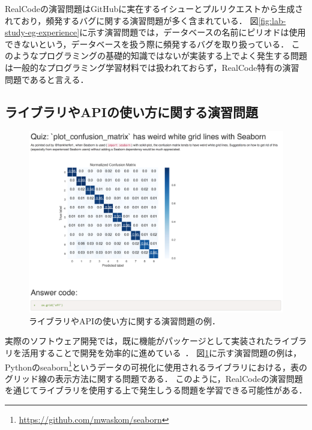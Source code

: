 RealCodeの演習問題はGitHubに実在するイシューとプルリクエストから生成されており，頻発するバグに関する演習問題が多く含まれている．
図\ref{fig:lab-study-eg-experience}に示す演習問題では，データベースの名前にピリオドは使用できないという，データベースを扱う際に頻発するバグを取り扱っている．
このようなプログラミングの基礎的知識ではないが実装する上でよく発生する問題は一般的なプログラミング学習材料では扱われておらず，RealCode特有の演習問題であると言える．


\subsection{ライブラリやAPIの使い方に関する演習問題}

\begin{figure}[t]
	\centering
  \includegraphics[width=1.0\columnwidth]{20190107-lab-study-lib-exercise.png}
  \caption{ライブラリやAPIの使い方に関する演習問題の例．}
  \label{fig:lab-study-eg-lib}
\end{figure}

実際のソフトウェア開発では，既に機能がパッケージとして実装されたライブラリを活用することで開発を効率的に進めている~\cite{Leveraging_API}．
図\ref{fig:lab-study-eg-lib}に示す演習問題の例は，Pythonのseaborn\footnote{\url{https://github.com/mwaskom/seaborn}}というデータの可視化に使用されるライブラリにおける，表のグリッド線の表示方法に関する問題である．
このように，RealCodeの演習問題を通じてライブラリを使用する上で発生しうる問題を学習できる可能性がある．
